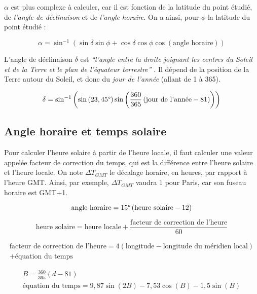 \documentclass[12pt]{article}
\begin{document}
$\alpha$ est plus complexe à calculer, car il est fonction de la latitude du point étudié, de \emph{l'angle de déclinaison} et de \emph{l'angle horaire}.
On a ainsi, pour $\phi$ la latitude du point étudié  \cite{pos_elevation_angle} :

\[
	\alpha = \sin^{-1} \left(
		\sin \delta \sin \phi +
		\cos \delta \cos \phi \cos \left( \text{angle horaire} \right)
	\right)
\]

L'angle de déclinaison $\delta$ est \emph{``l'angle entre la droite joignant les centres du Soleil et de la Terre et le plan de l'équateur terrestre''} \cite{mouvement_terre}. Il dépend de la position de la Terre autour du Soleil, et donc du \emph{jour de l'année} (allant de 1 à 365).

\[
	\delta = \sin^{-1} \left(
		\sin \left( 23,45\degree \right)
		\sin \left(
			\frac{360}{365}
			\left(
				\text{jour de l'année} - 81
			\right)
		\right)
	\right)
\]



\subsection{Angle horaire et temps solaire}

Pour calculer l'heure solaire à partir de l'heure locale, il faut calculer une valeur appelée facteur de correction du temps, qui est la différence entre l'heure solaire et l'heure locale.
On note $\Delta T_{GMT}$ le décalage horaire, en heures, par rapport à l'heure GMT.
Ainsi, par exemple, $\Delta T_{GMT}$ vaudra $1$ pour Paris, car son fuseau horaire est GMT+1.

\[
	\text{angle horaire} = 15 \degree \left(
		\text{heure solaire} - 12
	\right)
\]

\[
	\text{heure solaire} = \text{heure locale} + \frac{\text{facteur de correction de l'heure}}{60}
\]

\begin{multline*}
	\text{facteur de correction de l'heure} = 4 \left( \text{longitude} - \text{longitude du méridien local} \right) \\ + \text{équation du temps}
\end{multline*}

\begin{gather*}
	B = \frac{360}{365} \left( d - 81 \right) \\
	\text{équation du temps} = 9,87 \sin \left( 2B \right) - 7,53 \cos \left( B \right) - 1,5 \sin \left( B \right)
\end{gather*}
\end{document}
